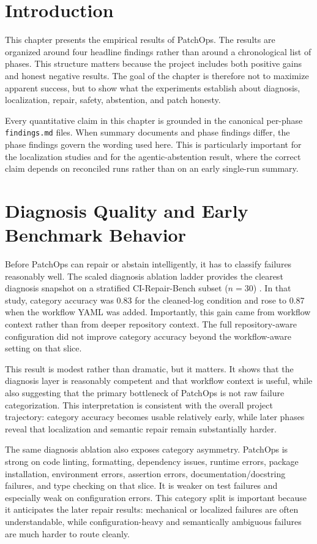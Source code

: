 \section{Introduction}

This chapter presents the empirical results of PatchOps. The results are organized
around four headline findings rather than around a chronological list of phases. This structure matters because
the project includes both positive gains and honest negative results. The goal of the chapter is therefore not
to maximize apparent success, but to show what the experiments establish about diagnosis, localization, repair,
safety, abstention, and patch honesty.

Every quantitative claim in this chapter is grounded in the canonical per-phase \texttt{findings.md} files. When
summary documents and phase findings differ, the phase findings govern the wording used here. This is
particularly important for the localization studies and for the agentic-abstention result, where the correct
claim depends on reconciled runs rather than on an early single-run summary.

\section{Diagnosis Quality and Early Benchmark Behavior}

Before PatchOps can repair or abstain intelligently, it has to classify failures reasonably well. The scaled
diagnosis ablation ladder provides the clearest diagnosis snapshot on a stratified CI-Repair-Bench subset
(\(n=30\)) \cite{cirepairbench2026}. In that study, category accuracy was 0.83 for the cleaned-log condition and rose to 0.87 when the
workflow YAML was added. Importantly, this gain came from workflow context rather than from deeper repository
context. The full repository-aware configuration did not improve category accuracy beyond the workflow-aware
setting on that slice.

This result is modest rather than dramatic, but it matters. It shows that the diagnosis layer is reasonably
competent and that workflow context is useful, while also suggesting that the primary bottleneck of PatchOps is
not raw failure categorization. This interpretation is consistent with the overall project trajectory: category
accuracy becomes usable relatively early, while later phases reveal that localization and semantic repair remain
substantially harder.

The same diagnosis ablation also exposes category asymmetry. PatchOps is strong on code linting, formatting,
dependency issues, runtime errors, package installation, environment errors, assertion errors,
documentation/docstring failures, and type checking on that slice. It is weaker on test failures and especially
weak on configuration errors. This category split is important because it anticipates the later repair results:
mechanical or localized failures are often understandable, while configuration-heavy and semantically ambiguous
failures are much harder to route cleanly.

